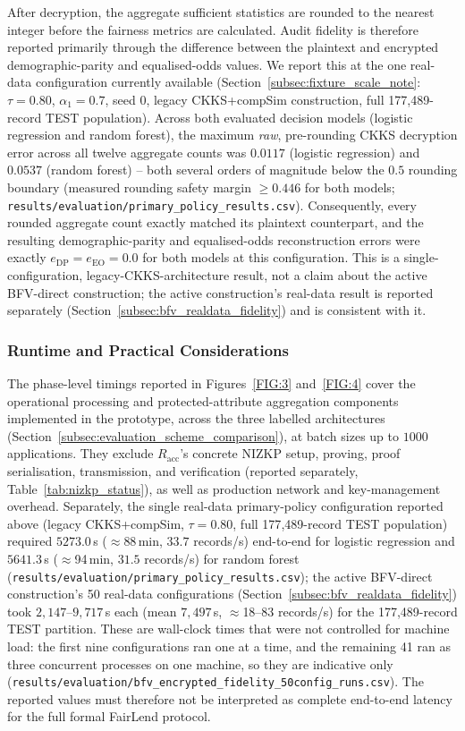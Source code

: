 \documentclass[a4paper,fleqn]{cas-dc}
\begin{document}
After decryption, the aggregate sufficient statistics are rounded to the
nearest integer before the fairness metrics are calculated. Audit fidelity is
therefore reported primarily through the difference between the plaintext and
encrypted demographic-parity and equalised-odds values. We report this at the
one real-data configuration currently available (Section~\ref{subsec:fixture_scale_note}: $\tau=0.80$, $\alpha_1=0.7$, seed $0$, legacy CKKS+compSim construction, full 177{,}489-record TEST population). Across both
evaluated decision models (logistic regression and random forest), the
maximum \emph{raw}, pre-rounding CKKS decryption error across all twelve
aggregate counts was $0.0117$ (logistic regression) and $0.0537$ (random
forest) -- both several orders of magnitude below the $0.5$ rounding
boundary (measured rounding safety margin $\geq 0.446$ for both models;
\texttt{results/evaluation/primary\_policy\_results.csv}). Consequently, every
rounded aggregate count exactly matched its plaintext counterpart, and the
resulting demographic-parity and equalised-odds reconstruction errors were
exactly $e_{\mathrm{DP}}=e_{\mathrm{EO}}=0.0$ for both models at this
configuration. This is a single-configuration, legacy-CKKS-architecture
result, not a claim about the active BFV-direct construction; the active construction's real-data result is reported separately (Section~\ref{subsec:bfv_realdata_fidelity}) and is consistent with it.

\subsubsection{Runtime and Practical Considerations} The phase-level timings reported in Figures~\ref{FIG:3} and~\ref{FIG:4} cover the operational processing and protected-attribute aggregation components implemented in the prototype, across the three labelled architectures (Section~\ref{subsec:evaluation_scheme_comparison}), at batch sizes up to $1000$ applications. They exclude $R_{\mathrm{acc}}$'s concrete NIZKP setup, proving, proof serialisation, transmission, and verification (reported separately, Table~\ref{tab:nizkp_status}), as well as production network and key-management overhead. Separately, the single real-data primary-policy configuration reported above (legacy CKKS+compSim, $\tau=0.80$, full 177{,}489-record TEST population) required $5273.0$\,s ($\approx$88\,min, $33.7$ records/s) end-to-end for logistic regression and $5641.3$\,s ($\approx$94\,min, $31.5$ records/s) for random forest (\texttt{results/evaluation/primary\_policy\_results.csv}); the active BFV-direct construction's 50 real-data configurations (Section~\ref{subsec:bfv_realdata_fidelity}) took $2{,}147$--$9{,}717$\,s each (mean $7{,}497$\,s, $\approx$18--83 records/s) for the 177{,}489-record TEST partition. These are wall-clock times that were not controlled for machine load: the first nine configurations ran one at a time, and the remaining 41 ran as three concurrent processes on one machine, so they are indicative only (\texttt{results/evaluation/bfv\_encrypted\_fidelity\_50config\_runs.csv}). The reported values must therefore not be interpreted as complete end-to-end latency for the full formal FairLend protocol.
\end{document}
